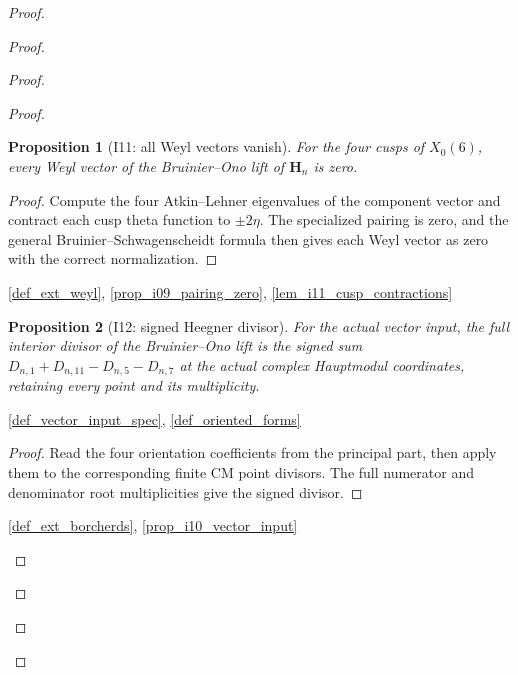 \documentclass[11pt,a4paper]{article}
\numberwithin{equation}{section}
\theoremstyle{plain}\newtheorem{theorem}{Theorem}[section]\newaliascnt{proposition}{theorem}\newtheorem{proposition}[proposition]{Proposition}\aliascntresetthe{proposition}\newaliascnt{lemma}{theorem}\newtheorem{lemma}[lemma]{Lemma}\aliascntresetthe{lemma}
\theoremstyle{definition}\newaliascnt{definition}{theorem}\newtheorem{definition}[definition]{Definition}\aliascntresetthe{definition}\newaliascnt{notation}{theorem}\newtheorem{notation}[notation]{Notation}\aliascntresetthe{notation}
\providecommand{\lean}[1]{}\providecommand{\leanok}{}
\begin{document}
\begin{proof}
\begin{proof}
\begin{proof}
\begin{proof}
\begin{proposition}[I11: all Weyl vectors vanish]\label{prop_i11_weyl_zero}\lean{SptCM.Analytic.Repaired.auxiliaryHn_realComponentWeylVectors_eq_zero}\leanok
For the four cusps of $X_0(6)$, every Weyl vector of the Bruinier--Ono lift of $\mathbf H_n$ is zero.
\end{proposition}
\begin{proof}
Compute the four Atkin--Lehner eigenvalues of the component vector and contract each cusp theta function to $\pm2\eta$.  The specialized pairing is zero, and the general Bruinier--Schwagenscheidt formula then gives each Weyl vector as zero with the correct normalization.
\end{proof}
\begin{uses-proof}\ref{def_ext_weyl}, \ref{prop_i09_pairing_zero}, \ref{lem_i11_cusp_contractions}\end{uses-proof}

\begin{proposition}[I12: signed Heegner divisor]\label{prop_i12_heegner_divisor}\lean{SptCM.Analytic.Repaired.actualI12Lift_divisor_eq_full}\leanok
For the actual vector input, the full interior divisor of the Bruinier--Ono lift is the signed sum $D_{n,1}+D_{n,11}-D_{n,5}-D_{n,7}$ at the actual complex Hauptmodul coordinates, retaining every point and its multiplicity.
\end{proposition}
\begin{uses-statement}\ref{def_vector_input_spec}, \ref{def_oriented_forms}\end{uses-statement}
\begin{proof}Read the four orientation coefficients from the principal part, then apply them to the corresponding finite CM point divisors. The full numerator and denominator root multiplicities give the signed divisor.\end{proof}
\begin{uses-proof}\ref{def_ext_borcherds}, \ref{prop_i10_vector_input}\end{uses-proof}


\end{proof}
\end{proof}
\end{proof}
\end{proof}
\end{document}
